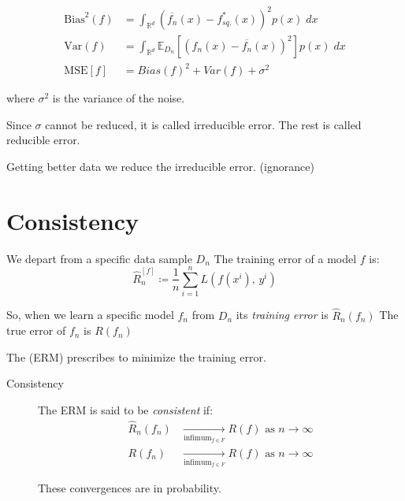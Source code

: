 \begin{align*}
	\text{Bias}^2(f) & = \int_{\mathds{R}^d} \left( \overline{f_n}(x) - f_{sq.}^*(x) \right)^2 p(x)\; dx                           \\
	\text{Var}(f)    & = \int_{\mathds{R}^d} \mathds{E}_{D_n} \left[ \left( f_n(x) - \overline{f_n}(x) \right)^2 \right] p(x)\; dx \\
	\text{MSE}[f]    & = Bias(f)^2 + Var(f) + \sigma^2
\end{align*}

where \(\sigma^2\) is the variance of the noise.

Since \(\sigma\) cannot be reduced, it is called irreducible error. The
rest is called reducible error. 

Getting better data we reduce the irreducible error. (ignorance)

\section{Consistency}

We depart from a specific data sample \(D_n\) The training error of a
model \(f\) is:
\begin{equation*}
	\hat{R}_n^{[f]} \coloneqq \frac{1}{n} \sum_{i=1}^n L(f(x^i),\, y^i)
\end{equation*}

So, when we learn a specific model \(f_n\) from \(D_n\) its
\emph{training error} is \(\hat{R}_n(f_n)\) The true error of \(f_n\)
is \(R(f_n)\)

The  (ERM) prescribes to minimize the
training error. 

\begin{description}
	\item[Consistency]
		The ERM is said to be \emph{consistent} if:
		\begin{align*}
			\hat{R}_n(f_n) & \xrightarrow[\text{infimum}_{f \in F}]{} R(f)
			\text{ as } n \rightarrow \infty                               \\
			R(f_n)         & \xrightarrow[\text{infimum}_{f \in F}]{} R(f)
			\text{ as } n \rightarrow \infty
		\end{align*}

		These convergences are in probability.
\end{description}

